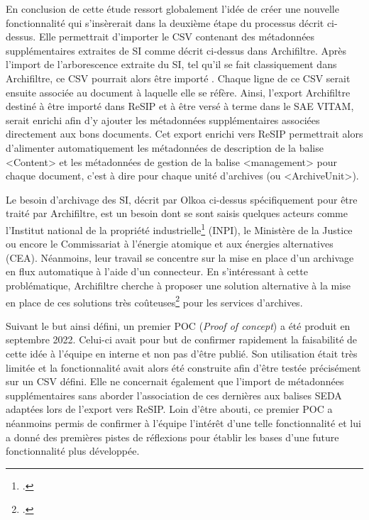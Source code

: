 \clearpage



En conclusion de cette étude ressort globalement l’idée de créer une nouvelle fonctionnalité qui s'insèrerait dans la deuxième étape du processus décrit ci-dessus. Elle permettrait d’importer le CSV contenant des métadonnées supplémentaires extraites de \gls{SI} comme décrit ci-dessus dans \gls{Archifiltre}. Après l’import de l’arborescence extraite du \gls{SI}, tel qu’il se fait classiquement dans \gls{Archifiltre}, ce CSV pourrait alors être importé . Chaque ligne de ce CSV serait ensuite associée au document à laquelle elle se réfère. Ainsi, l’export \gls{Archifiltre} destiné à être importé dans ReSIP et à être versé à terme dans le \gls{SAE} \gls{VITAM}, serait enrichi afin d’y ajouter les métadonnées supplémentaires associées directement aux bons documents. Cet export enrichi vers ReSIP permettrait alors d’alimenter automatiquement les métadonnées de description de la balise <Content> et les métadonnées de gestion de la balise <management> pour chaque document, c’est à dire pour chaque \gls{unité d’archives} (ou <ArchiveUnit>).

\clearpage



Le besoin d’archivage des \gls{SI}, décrit par Olkoa ci-dessus spécifiquement pour être traité par \gls{Archifiltre}, est un besoin dont se sont saisis quelques acteurs comme l’Institut national de la propriété industrielle\footcite[p.10]{disic_mandat_2012} (INPI), le Ministère de la Justice ou encore le Commissariat à l'énergie atomique et aux énergies alternatives (CEA). Néanmoins, leur travail se concentre sur la mise en place d’un archivage en flux automatique à l’aide d’un connecteur. En s’intéressant à cette problématique, \gls{Archifiltre} cherche à proposer une solution alternative à la mise en place de ces solutions très coûteuses\footcite[p.12]{disic_mandat_2012} pour les services d'archives.


Suivant le but ainsi défini, un premier \gls{POC} (\textit{Proof of concept}) a été produit en septembre 2022.  Celui-ci avait pour but de confirmer rapidement la faisabilité de cette idée à l’équipe en interne et non pas d’être publié. Son utilisation était très limitée et la fonctionnalité avait alors été construite afin d’être testée précisément sur un CSV défini. Elle ne concernait également que l’import de métadonnées supplémentaires sans aborder l’association de ces dernières aux balises \gls{SEDA} adaptées lors de l’export vers ReSIP. Loin d’être abouti, ce premier POC a néanmoins permis de confirmer à l’équipe l’intérêt d’une telle fonctionnalité et lui a donné des premières pistes de réflexions pour établir les bases d’une future fonctionnalité plus développée. 


